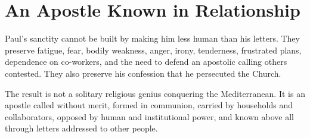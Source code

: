 \section{An Apostle Known in Relationship}

Paul's sanctity cannot be built by making him less human than his letters.
They preserve fatigue, fear, bodily weakness, anger, irony, tenderness,
frustrated plans, dependence on co-workers, and the need to defend an apostolic
calling others contested. They also preserve his confession that he persecuted
the Church.

The result is not a solitary religious genius conquering the Mediterranean.
It is an apostle called without merit, formed in communion, carried by
households and collaborators, opposed by human and institutional power, and
known above all through letters addressed to other people.
